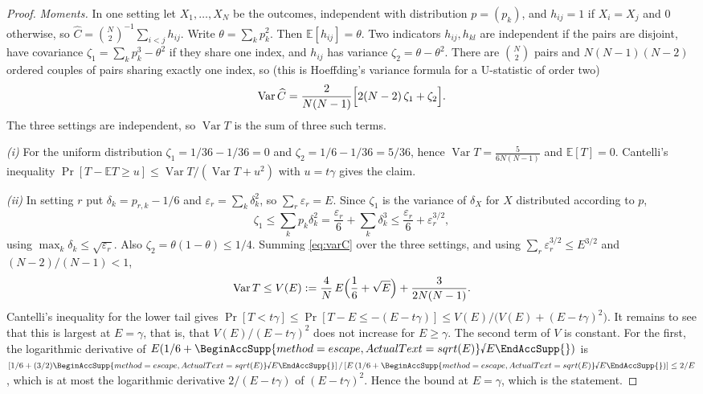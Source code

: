 \documentclass[11pt]{article}
\newcommand{\rsym}[2]{\BeginAccSupp{method=escape,ActualText=sqrt(#2)}\text{\textsurd}#1\EndAccSupp{}}
\newcommand{\E}{E}                       %
\theoremstyle{definition}
\theoremstyle{remark}
\begin{document}
\begin{proof}
\emph{Moments.} In one setting let $X_1,\dots,X_N$ be the outcomes, independent with distribution $p=(p_k)$, and
$h_{ij}=1$ if $X_i=X_j$ and $0$ otherwise, so $\widehat C=\binom N2^{-1}\sum_{i<j}h_{ij}$. Write
$\theta=\sum_kp_k^2$. Then $\mathbb E[h_{ij}]=\theta$. Two indicators $h_{ij},h_{kl}$ are independent if the pairs are
disjoint, have covariance $\zeta_1=\sum_kp_k^3-\theta^2$ if they share one index, and $h_{ij}$ has variance
$\zeta_2=\theta-\theta^2$. There are $\binom N2$ pairs and $N(N-1)(N-2)$ ordered couples of pairs sharing exactly one
index, so (this is Hoeffding's variance formula for a U-statistic of order two)
\begin{equation}\label{eq:varC}
  \operatorname{Var}\widehat C=\frac{2}{N(N-1)}\Bigl[2(N-2)\,\zeta_1+\zeta_2\Bigr].
\end{equation}
The three settings are independent, so $\operatorname{Var}T$ is the sum of three such terms.

\emph{(i)} For the uniform distribution $\zeta_1=1/36-1/36=0$ and $\zeta_2=1/6-1/36=5/36$,
hence $\operatorname{Var}T=\frac{5}{6N(N-1)}$ and $\mathbb E[T]=0$. Cantelli's inequality
$\Pr[T-\mathbb E T\ge u]\le\operatorname{Var}T/(\operatorname{Var}T+u^2)$ with $u=t\gamma$ gives the claim.

\emph{(ii)} In setting $r$ put $\delta_k=p_{r,k}-1/6$ and $\varepsilon_r=\sum_k\delta_k^2$, so
$\sum_r\varepsilon_r=\E$. Since $\zeta_1$ is the variance of $\delta_X$ for $X$ distributed according to $p$,
\[
  \zeta_1\le\sum_kp_k\delta_k^2=\frac{\varepsilon_r}{6}+\sum_k\delta_k^3\le\frac{\varepsilon_r}{6}+\varepsilon_r^{3/2},
\]
using $\max_k\delta_k\le\sqrt{\varepsilon_r}$. Also $\zeta_2=\theta(1-\theta)\le1/4$. Summing \eqref{eq:varC} over
the three settings, and using $\sum_r\varepsilon_r^{3/2}\le\E^{3/2}$ and $(N-2)/(N-1)<1$,
\[
  \operatorname{Var}T\le V(\E):=\frac4N\,\E\Bigl(\frac16+\sqrt{\E}\Bigr)+\frac{3}{2N(N-1)} .
\]
Cantelli's inequality for the lower tail gives
$\Pr[T<t\gamma]\le\Pr[T-\E\le-(\E-t\gamma)]\le V(\E)/\bigl(V(\E)+(\E-t\gamma)^2\bigr)$. It remains to see
that this is largest at $\E=\gamma$, that is, that $V(\E)/(\E-t\gamma)^2$ does not increase for $\E\ge\gamma$. The
second term of $V$ is constant. For the first, the logarithmic derivative of $\E(1/6+\rsym{\E}{E})$ is
$[1/6+(3/2)\rsym{\E}{E}]\,/\,[\E\,(1/6+\rsym{\E}{E})]\le2/\E$, which is at most the logarithmic
derivative $2/(\E-t\gamma)$ of $(\E-t\gamma)^2$. Hence the bound at $\E=\gamma$, which is the statement.
\end{proof}
\end{document}
